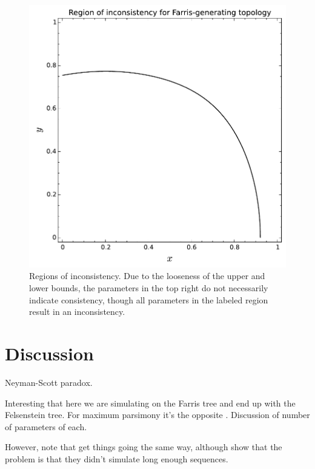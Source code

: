 \documentclass[a4paper]{article}
\begin{document}
\begin{figure}
\centering
\includegraphics[width=.9\textwidth]{analytic-inconsistency}
\caption{
    Regions of inconsistency.
    Due to the looseness of the upper and lower bounds, the parameters in the top right do not necessarily indicate consistency, though all parameters in the labeled region result in an inconsistency.
}
\label{fig:inconsistency-farris}
\end{figure}

\section{Discussion}

Neyman-Scott paradox.

Interesting that here we are simulating on the Farris tree and end up with the Felsenstein tree.
For maximum parsimony it's the opposite \cite{Felsenstein1978-rr}.
Discussion of number of parameters of each.

However, note that \cite{Siddall1998-hq} get things going the same way, although \cite{Swofford2001-hr} show that the problem is that they didn't simulate long enough sequences.





\end{document}
